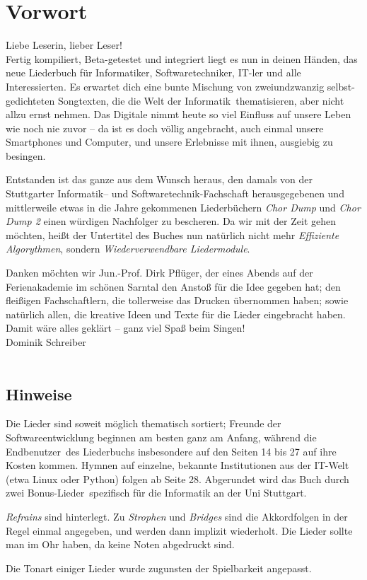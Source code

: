 \section*{Vorwort}

Liebe Leserin, lieber Leser! \\
			
Fertig kompiliert, Beta-getestet und integriert liegt es nun in deinen Händen, das neue Liederbuch für Informatiker, Softwaretechniker, IT-ler und alle Interessierten. 
Es erwartet dich eine bunte Mischung von zweiundzwanzig selbst-gedichteten Songtexten, die die \glqq Welt der Informatik\grqq \ thematisieren, aber nicht allzu ernst nehmen. Das Digitale nimmt heute so viel Einfluss auf unsere Leben wie noch nie zuvor -- da ist es doch völlig angebracht, auch einmal unsere Smartphones und Computer, und unsere Erlebnisse mit ihnen, ausgiebig zu besingen.

Entstanden ist das ganze aus dem Wunsch heraus, den damals von der Stuttgarter Informatik-- und Softwaretechnik-Fachschaft herausgegebenen und mittlerweile etwas in die Jahre gekommenen Liederbüchern \emph{Chor Dump} und \emph{Chor Dump 2} einen würdigen Nachfolger zu bescheren.
Da wir mit der Zeit gehen möchten, heißt der Untertitel des Buches nun natürlich nicht mehr \emph{Effiziente Algorythmen}, sondern \emph{Wiederverwendbare Liedermodule}.

Danken möchten wir Jun.-Prof. Dirk Pflüger, der eines Abends auf der Ferienakademie im schönen Sarntal den Anstoß für die Idee gegeben hat; den fleißigen Fachschaftlern, die tollerweise das Drucken übernommen haben; sowie natürlich allen, die kreative Ideen und Texte für die Lieder eingebracht haben. \\

Damit wäre alles geklärt -- ganz viel Spaß beim Singen! \\

\hfill Dominik Schreiber \\

\ \\

\subsection*{Hinweise}

Die Lieder sind soweit möglich thematisch sortiert; Freunde der Softwareentwicklung beginnen am besten ganz am Anfang, während die \glqq Endbenutzer\grqq \ des Liederbuchs insbesondere auf den Seiten 14 bis 27 auf ihre Kosten kommen. Hymnen auf einzelne, bekannte Institutionen aus der IT-Welt (etwa Linux oder Python) folgen ab Seite 28. Abgerundet wird das Buch durch zwei \glqq Bonus-Lieder\grqq \ spezifisch für die Informatik an der Uni Stuttgart.

\emph{Refrains} sind hinterlegt.
Zu \emph{Strophen} und \emph{Bridges} sind die Akkordfolgen in der Regel einmal angegeben, und werden dann implizit wiederholt. Die Lieder sollte man im Ohr haben, da keine Noten abgedruckt sind.

Die Tonart einiger Lieder wurde zugunsten der Spielbarkeit angepasst.

\pagebreak
